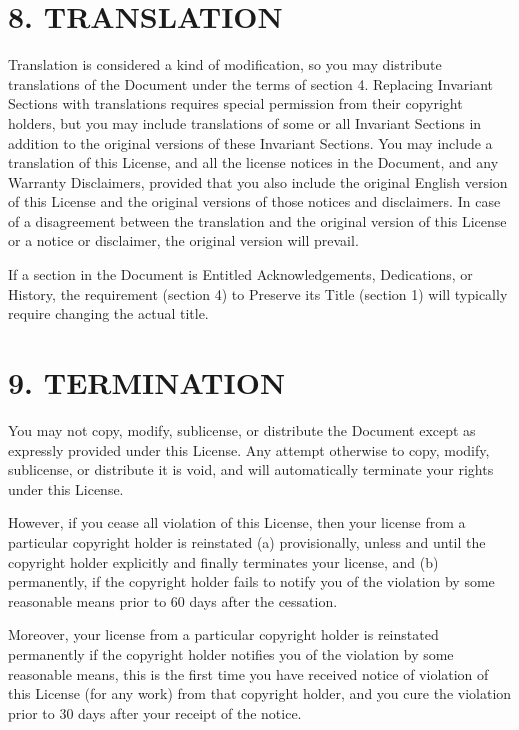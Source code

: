 \documentclass[captions=tableheading]{scrbook}
\begin{document}
\section{8. TRANSLATION}
\label{sec-3-9}


Translation is considered a kind of modification, so you may distribute translations of the Document under the terms of section 4. Replacing Invariant Sections with translations requires special permission from their copyright holders, but you may include translations of some or all Invariant Sections in addition to the original versions of these Invariant Sections. You may include a translation of this License, and all the license notices in the Document, and any Warranty Disclaimers, provided that you also include the original English version of this License and the original versions of those notices and disclaimers. In case of a disagreement between the translation and the original version of this License or a notice or disclaimer, the original version will prevail.

If a section in the Document is Entitled Acknowledgements, Dedications, or History, the requirement (section 4) to Preserve its Title (section 1) will typically require changing the actual title.
\section{9. TERMINATION}
\label{sec-3-10}


You may not copy, modify, sublicense, or distribute the Document except as expressly provided under this License. Any attempt otherwise to copy, modify, sublicense, or distribute it is void, and will automatically terminate your rights under this License.

However, if you cease all violation of this License, then your license from a particular copyright holder is reinstated (a) provisionally, unless and until the copyright holder explicitly and finally terminates your license, and (b) permanently, if the copyright holder fails to notify you of the violation by some reasonable means prior to 60 days after the cessation.

Moreover, your license from a particular copyright holder is reinstated permanently if the copyright holder notifies you of the violation by some reasonable means, this is the first time you have received notice of violation of this License (for any work) from that copyright holder, and you cure the violation prior to 30 days after your receipt of the notice. 
\end{document}

